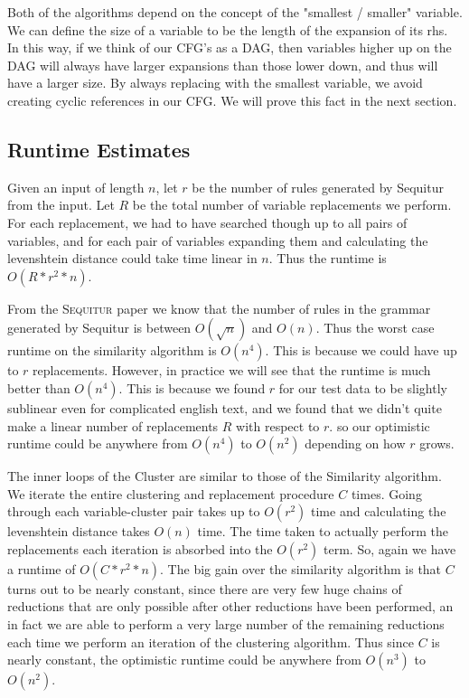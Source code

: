 \documentclass[11pt]{article}
\newcommand{\Sequitur}{\textsc{Sequitur}\xspace}
\begin{document}
Both of the algorithms depend on the concept of the "smallest / smaller"
variable. We can define the size of a variable to be the length of
the expansion of its rhs. In this way, if we think of our CFG's as a DAG, then
variables higher up on the DAG will always have larger expansions than
those lower down, and thus will have a larger size. By always replacing
with the smallest variable, we avoid creating cyclic references in our CFG.
We will prove this fact in the next section.

\subsection{Runtime Estimates}
Given an input of length $n$, let $r$ be the number of rules generated
by Sequitur from the input. Let $R$ be the total number of variable
replacements we perform. For each replacement, we had to have searched though
up to all pairs of variables, and for each pair of variables expanding
them and calculating the levenshtein distance could take time linear in $n$.
Thus the runtime is $\boxed{O(R*r^2*n)}$. 

From the \Sequitur paper \cite{sequitur} we
know that the number of rules in the grammar generated by Sequitur
is between $O(\sqrt{n})$ and $O(n)$. Thus the worst case runtime on the similarity
algorithm is $\boxed{O(n^4)}$. This is because we could have up to $r$ replacements.
However, in practice we will see that the runtime is much better
than $O(n^4)$. This is because we found $r$ for our test data to be slightly sublinear
even for complicated english text, and we found that we didn't quite make a linear
number of replacements $R$ with respect to $r$.
so our optimistic runtime could be anywhere 
from $O(n^4)$ to $O(n^{2})$ depending on how $r$ grows.



The inner loops of the Cluster are similar to those of the Similarity algorithm.
We iterate the entire clustering and replacement procedure $C$ times. Going through
each variable-cluster pair takes up to $O(r^2)$ time and calculating the levenshtein
distance takes $O(n)$ time. The time taken to actually perform the replacements each
iteration is absorbed into the $O(r^2)$ term. So, again we have a runtime of
$\boxed{O(C*r^2*n)}$. The big gain over the similarity algorithm is that $C$ turns out
to be nearly constant, since there are very few huge chains of reductions that are
only possible after other reductions have been performed, an in fact we are able to 
perform a very large number of the remaining reductions each time we perform an iteration
of the clustering algorithm. Thus since $C$ is nearly constant, the optimistic runtime
could be anywhere from $O(n^3)$ to $O(n^2)$. 
\end{document}
